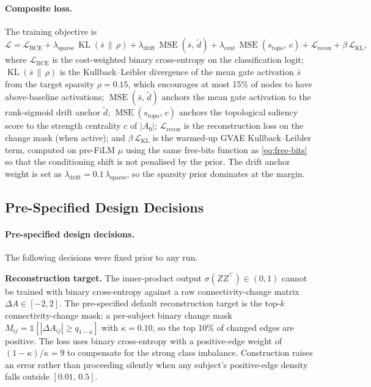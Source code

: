 \paragraph{Composite loss.}
The training objective is
\begin{equation}
  \mathcal{L}
  = \mathcal{L}_{\text{BCE}}
  + \lambda_{\text{sparse}}\,\operatorname{KL}(\bar{s} \,\|\, \rho)
  + \lambda_{\text{drift}}\,\operatorname{MSE}(\bar{s},\, \tilde{d})
  + \lambda_{\text{cent}}\,\operatorname{MSE}(s_{\text{topo}},\, c)
  + \mathcal{L}_{\text{recon}}
  + \beta\,\mathcal{L}_{\text{KL}},
  \label{eq:tfgn-loss}
\end{equation}
where $\mathcal{L}_{\text{BCE}}$ is the cost-weighted binary cross-entropy on the
classification logit; $\operatorname{KL}(\bar{s} \,\|\, \rho)$ is the
Kullback--Leibler divergence of the mean gate activation $\bar{s}$ from the target
sparsity $\rho = 0.15$, which encourages at most 15\% of nodes to have above-baseline
activations; $\operatorname{MSE}(\bar{s},\, \tilde{d})$ anchors the mean gate activation
to the rank-sigmoid drift anchor $\tilde{d}$; $\operatorname{MSE}(s_{\text{topo}},\, c)$
anchors the topological saliency score to the strength centrality $c$ of $|A_0|$;
$\mathcal{L}_{\text{recon}}$ is the reconstruction loss on the change mask (when active);
and $\beta\,\mathcal{L}_{\text{KL}}$ is the warmed-up \ac{GVAE} Kullback--Leibler term,
computed on pre-FiLM $\mu$ using the same free-bits function as \autoref{eq:free-bits} so
that the conditioning shift is not penalised by the prior. The drift anchor weight is set
as $\lambda_{\text{drift}} = 0.1\,\lambda_{\text{sparse}}$, so the sparsity prior
dominates at the margin.

\subsection{Pre-Specified Design Decisions}\label{sec:tfgn-decisions}

\paragraph{Pre-specified design decisions.}
The following decisions were fixed prior to any run.

\textbf{Reconstruction target.} The inner-product output $\sigma(ZZ^\top) \in (0,1)$
cannot be trained with binary cross-entropy against a raw connectivity-change matrix
$\Delta A \in [-2,2]$. The pre-specified default reconstruction target is the top-$k$ connectivity-change
mask: a per-subject binary change mask $M_{ij} = \mathbb{1}[|\Delta
A_{ij}| \geq q_{1-\kappa}]$ with $\kappa = 0.10$, so the top 10\% of changed edges are
positive. The loss uses binary cross-entropy with a positive-edge weight of
$(1 - \kappa)/\kappa = 9$ to compensate for the strong class imbalance. Construction
raises an error rather than proceeding silently when any subject's positive-edge density
falls outside $[0.01,\, 0.5]$.


